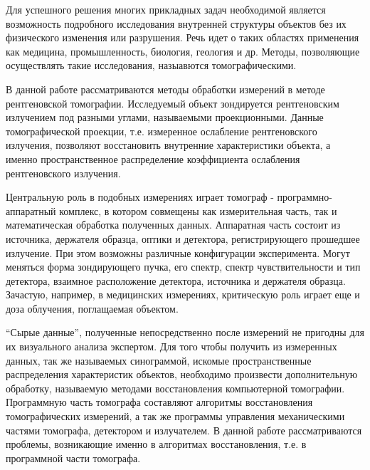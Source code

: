 {\actuality} Для успешного решения многих прикладных задач необходимой является возможность подробного исследования внутренней структуры объектов без их физического изменения или разрушения.
Речь идет о таких областях применения как медицина, промышленность, биология, геология и др. 
Методы, позволяющие осуществлять такие исследования, назыавются томографическими.


\begin{comment}
Современное развитие вычислительной техники, повышение ее доступности, появление новых инструментариев обработки информации, развитие алгоритмов и компьютерных наук в целом, делают возможным применение алгоритмов обработки изображений для анализа результатов томографических измерений.
\end{comment}
В данной работе рассматриваются методы обработки измерений в методе рентгеновской томографии.
Исследуемый объект зондируется рентгеновским излучением под разными углами, называемыми проекционными.
Данные томографической проекции, т.е. измеренное ослабление рентгеновского излучения, позволяют восстановить внутренние характеристики объекта, а именно пространственное распределение коэффициента ослабления рентгеновского излучения.

Центральную роль в подобных измерениях играет томограф - программно-аппаратный комплекс, в котором совмещены как измерительная часть, так и математическая обработка полученных данных.
Аппаратная часть состоит из источника, держателя образца, оптики и детектора, регистрирующего прошедшее излучение. 
При этом возможны различные конфигурации эксперимента. 
Могут меняться форма зондирующего пучка, его спектр, спектр чувствительности и тип детектора, взаимное расположение детектора, источника и держателя образца.
Зачастую, например, в медицинских измерениях, критическую роль играет еще и доза облучения, поглащаемая объектом.

``Сырые данные'', полученные непосредственно после измерений не пригодны для их визуального анализа экспертом.
Для того чтобы получить из измеренных данных, так же называемых синограммой, искомые пространственные распределения характеристик объектов, необходимо произвести дополнительную обработку, называемую методами восстановления компьютерной томографии.
Программную часть томографа составляют алгоритмы восстановления томографических измерений, а так же программы управления механическими частями томографа, детектором и излучателем.
В данной работе рассматриваются проблемы, возникающие именно в алгоритмах восстановления, т.е. в программной части томографа.

